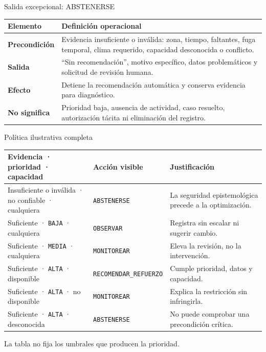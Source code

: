 \documentclass[aspectratio=169,11pt]{beamer}
\newcommand{\accion}[1]{\texttt{#1}}
\begin{document}
\begin{frame}{Salida excepcional: ABSTENERSE}
  \small
  \begin{tabularx}{\textwidth}{>{\bfseries}p{}X}
    \toprule
    Elemento & Definición operacional \\\midrule
    Precondición & Evidencia insuficiente o inválida: zona, tiempo, faltantes, fuga temporal, clima requerido, capacidad desconocida o conflicto. \\
    Salida & ``Sin recomendación'', motivo específico, datos problemáticos y solicitud de revisión humana. \\
    Efecto & Detiene la recomendación automática y conserva evidencia para diagnóstico. \\
    No significa & Prioridad baja, ausencia de actividad, caso resuelto, autorización tácita ni eliminación del registro. \\
    \bottomrule
  \end{tabularx}
\end{frame}

\begin{frame}{Política ilustrativa completa}
  \scriptsize
  \begin{tabularx}{\textwidth}{>{\raggedright\arraybackslash}p{}>{\raggedright\arraybackslash}p{}X}
    \toprule
    Evidencia · prioridad · capacidad & Acción visible & Justificación \\\midrule
    Insuficiente o inválida · no confiable · cualquiera & \accion{ABSTENERSE} & La seguridad epistemológica precede a la optimización. \\
    Suficiente · \accion{BAJA} · cualquiera & \accion{OBSERVAR} & Registra sin escalar ni sugerir cambio. \\
    Suficiente · \accion{MEDIA} · cualquiera & \accion{MONITOREAR} & Eleva la revisión, no la intervención. \\
    Suficiente · \accion{ALTA} · disponible & \accion{RECOMENDAR\_REFUERZO} & Cumple prioridad, datos y capacidad. \\
    Suficiente · \accion{ALTA} · no disponible & \accion{MONITOREAR} & Explica la restricción sin infringirla. \\
    Suficiente · \accion{ALTA} · desconocida & \accion{ABSTENERSE} & No puede comprobar una precondición crítica. \\
    \bottomrule
  \end{tabularx}
  \vfill
  \alert{La tabla no fija los umbrales que producen la prioridad.}
\end{frame}
\end{document}
